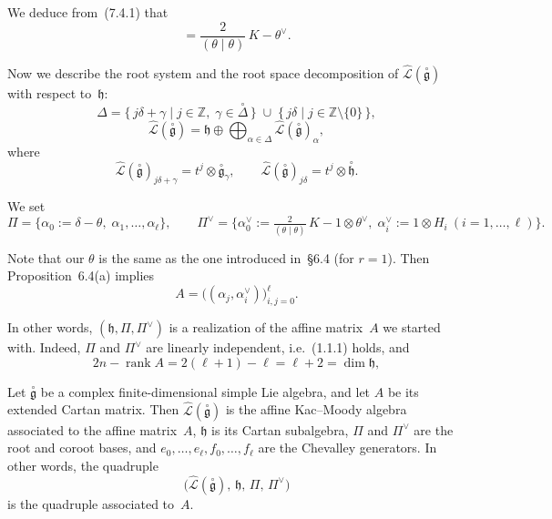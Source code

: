 \documentclass[12pt]{article}
\begin{document}
We deduce from~(7.4.1) that
\begin{equation}
[E_0, F_0] = \frac{2}{(\theta\mid\theta)}\,K - \theta^\vee.
\tag{7.4.2}
\end{equation}

Now we describe the root system and the root space decomposition of 
$\widehat{\mathcal{L}}(\overset{\circ}{\mathfrak{g}})$ with respect to~$\mathfrak{h}$:
\[
\Delta = \{\, j\delta + \gamma \mid j \in \mathbb{Z},\; \gamma \in \overset{\circ}{\Delta}\,\}
       \;\cup\;
       \{\, j\delta \mid j \in \mathbb{Z}\setminus\{0\}\,\},
\]
\[
\widehat{\mathcal{L}}(\overset{\circ}{\mathfrak{g}})
= \mathfrak{h} \oplus
  \bigoplus_{\alpha \in \Delta}
  \widehat{\mathcal{L}}(\overset{\circ}{\mathfrak{g}})_\alpha,
\]
where
\[
\widehat{\mathcal{L}}(\overset{\circ}{\mathfrak{g}})_{j\delta+\gamma}
= t^j \otimes \overset{\circ}{\mathfrak{g}}_\gamma,
\qquad
\widehat{\mathcal{L}}(\overset{\circ}{\mathfrak{g}})_{j\delta}
= t^j \otimes \overset{\circ}{\mathfrak{h}}.
\]

We set
\[
\Pi = \{\alpha_0 := \delta - \theta,\; \alpha_1,\dots,\alpha_\ell\},
\qquad
\Pi^\vee = \{\alpha_0^\vee := \tfrac{2}{(\theta\mid\theta)}\,K - 1\otimes\theta^\vee,\;
             \alpha_i^\vee := 1\otimes H_i \ (i=1,\dots,\ell)\}.
\]

Note that our $\theta$ is the same as the one introduced in~§6.4 (for $r=1$).
Then Proposition~6.4(a) implies
\begin{equation}
A = \big((\alpha_j,\alpha_i^\vee)\big)_{i,j=0}^\ell.
\tag{7.4.3}
\end{equation}

In other words, $(\mathfrak{h}, \Pi, \Pi^\vee)$ is a realization of the affine matrix~$A$ we started with.  
Indeed, $\Pi$ and $\Pi^\vee$ are linearly independent, i.e.~(1.1.1) holds, and
\[
2n - \operatorname{rank}A = 2(\ell + 1) - \ell = \ell + 2 = \dim \mathfrak{h},
\]

\begin{theorem}[7.4]
Let $\overset{\circ}{\mathfrak{g}}$ be a complex finite-dimensional simple Lie algebra, 
and let $A$ be its extended Cartan matrix.  
Then $\widehat{\mathcal{L}}(\overset{\circ}{\mathfrak{g}})$ is the affine Kac–Moody algebra
associated to the affine matrix~$A$, $\mathfrak{h}$ is its Cartan subalgebra,
$\Pi$ and $\Pi^\vee$ are the root and coroot bases, and
$e_0,\dots,e_\ell, f_0,\dots,f_\ell$ are the Chevalley generators.  
In other words, the quadruple
\[
\big(\widehat{\mathcal{L}}(\overset{\circ}{\mathfrak{g}}),\, 
\mathfrak{h},\, \Pi,\, \Pi^\vee\big)
\]
is the quadruple associated to~$A$.
\end{theorem}
\end{document}
